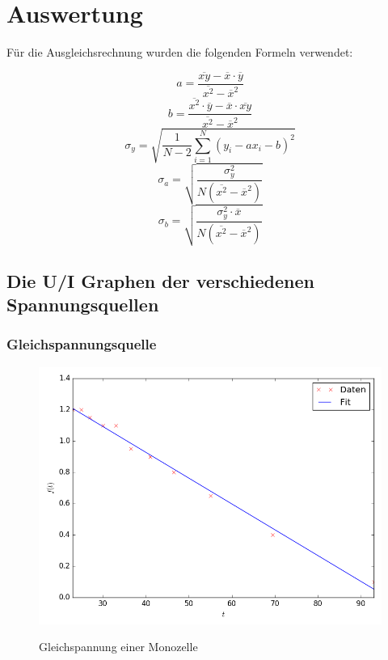 \section{Auswertung}
\label{sec:Auswertung}
Für die Ausgleichsrechnung wurden die folgenden Formeln verwendet:

\begin{equation}
	a=\frac{ \overline{xy} - \overline{x} \cdot \overline{y}}{\overline{x^2} - \overline{x}^2}
\end{equation}
\begin{equation}
	b=\frac{\overline{x^2} \cdot \overline{y} - \overline{x} \cdot \overline{xy}}{\overline{x^2} - \overline{x}^2}
\end{equation}
\begin{equation}
	\sigma_y=\sqrt{\frac{1}{N-2}\sum\limits_{i=1}^{N}(y_i - a x_i - b)^2}
\end{equation}
\begin{equation}
	\sigma_a=\sqrt{\frac{\sigma_y^2}{N ( \overline{x^2} - \overline{x} ^2 )}}
\end{equation}
\begin{equation}
	\sigma_b=\sqrt{\frac{\sigma_y^2 \cdot \overline{x}}{N ( \overline{x^2} - \overline{x} ^2 )}}
\end{equation}


	\subsection{Die U/I Graphen der verschiedenen Spannungsquellen}

\subsubsection{Gleichspannungsquelle}
\begin{figure}[H]
	\centering
	\caption{Gleichspannung einer Monozelle}
	\includegraphics[width=\linewidth-150pt,height=\textheight-150pt,keepaspectratio]{Gleichstrom.png}
	\label{fig:Gleichstrom}
\end{figure}


